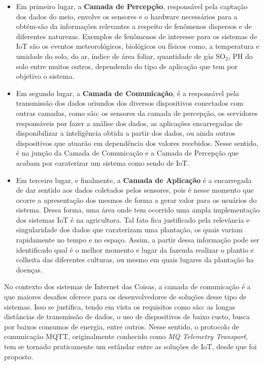 \documentclass[12pt, a4paper]{article}
\begin{document}
  \begin{itemize}
      \item Em primeiro lugar, a \textbf{Camada de Percepção}, responsável pela captação dos dados do meio, envolve os sensores e o hardware necessários para a obtém-são da informações relevantes a respeito de fenômenos dispersos e de diferentes naturezas. Exemplos de fenômenos de interesse para os sistemas de IoT são os eventos meteorológicos, biológicos ou físicos como, a temperatura e umidade do solo\cite{3}, do ar\cite{9}, índice de área foliar\cite{8}, quantidade de gás SO$_{2}$\cite{13}, PH do solo\cite{13} entre muitos outros, dependendo do tipo de aplicação que tem por objetivo o sistema.
      \item Em segundo lugar, a \textbf{Camada de Comunicação}, é a responsável pela transmissão dos dados oriundos dos diversos dispositivos conectados com outras camadas, como são: os sensores da camada de percepção, os servidores responsáveis por fazer a análise dos dados, as aplicações encarregadas de disponibilizar a inteligência obtida a partir dos dados, ou ainda outros dispositivos que atuarão em dependência dos valores recebidos. Nesse sentido, é na junção da Camada de Comunicação e a Camada de Percepção que acabam por caraterizar um sistema como sendo de IoT.
      \item Em terceiro lugar, e finalmente, a \textbf{Camada de Aplicação} é a encarregada de dar sentido aos dados coletados pelos sensores, pois é nesse momento que ocorre a apresentação dos mesmos de forma a gerar valor para os usuários do sistema. Dessa forma, uma área onde tem ocorrido uma ampla implementação dos sistemas IoT é na agricultora. Tal fato fica justificado pela relevância e singularidade dos dados que caraterizam uma plantação, os quais variam rapidamente no tempo e no espaço. Assim, a partir dessa informação pode ser identificado qual é o melhor momento e lugar da fazenda realizar o plantio e colheita das diferentes culturas\cite{1}, ou mesmo em quais lugares da plantação ha doenças\cite{2}.
      \end{itemize}

No contexto dos sistemas de Internet das Coisas, a camada de comunicação é a que maiores desafios oferece para os desenvolvedores de soluções desse tipo de sistemas. Isso se justifica, tendo em vista os requisitos como são: as longas distâncias de transmissão de dados, o uso de dispositivos de baixo custo, busca por baixos consumos de energia, entre outros. Nesse sentido, o protocolo de comunicação MQTT, originalmente conhecido como \textit{MQ Telemetry Transport}, tem se tornado praticamente um estândar entre as soluções de IoT, desde que foi proposto.
\end{document}
